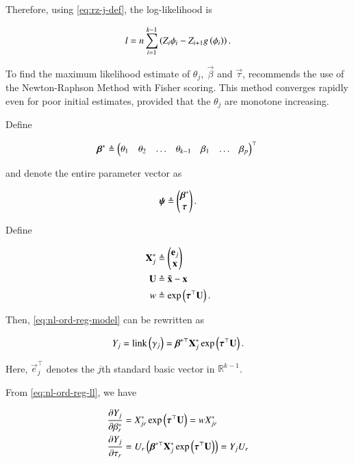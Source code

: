 \documentclass[journal,12pt,twocolumn]{IEEEtran}
\begin{document}
Therefore, using \eqref{eq:rz-j-def}, the log-likelihood is

\begin{equation}
     l = n\sum_{i=1}^{k-1}\brak{Z_i\phi_i - Z_{i+1}g\brak{\phi_i}}.
     \label{eq:ord-reg-l}
\end{equation}

To find the maximum likelihood estimate of \(\theta_j,\ \vec{\beta}\) and
\(\vec{\tau}\), \cite{PMC80} recommends the use of the Newton-Raphson Method
with Fisher scoring. This method converges rapidly even for poor initial
estimates, provided that the \(\theta_j\) are monotone increasing.

Define

\begin{equation}
     \vec{\beta}^* \triangleq \myvec{\theta_1 & \theta_2 & \ldots & \theta_{k-1} & \beta_1 & \ldots & \beta_p}^\top \\
     \label{eq:beta-star-def}
\end{equation}

and denote the entire parameter vector as

\begin{equation}
     \vec{\psi} \triangleq \myvec{\vec{\beta}^* \\ \vec{\tau}}.
     \label{eq:psi-def}
\end{equation}

Define

\begin{align}
     \vec{X}^*_j &\triangleq \myvec{\vec{e}_j \\ \vec{x}} \\
     \vec{U} &\triangleq \vec{\bar{x}} - \vec{x} \\
     w &\triangleq \exp\brak{\vec{\tau}^\top\vec{U}}.
\end{align}

Then, \eqref{eq:nl-ord-reg-model} can be rewritten as

\begin{equation}
     Y_j = \mathrm{link}\brak{\gamma_j} = \vec{\beta}^{*\top}\vec{X}^*_j\exp\brak{\vec{\tau}^\top\vec{U}}.
     \label{eq:nl-ord-reg-ll}
\end{equation}

Here, \(\vec{e}_j^\top\) denotes the \(j\)th standard basic vector in
\(\mathbb{R}^{k-1}\). 

From \eqref{eq:nl-ord-reg-ll}, we have

\begin{align}
     \pdiff{\beta^*_r}{Y_j} &= X^*_{jr}\exp\brak{\vec{\tau}^\top\vec{U}} = wX^*_{jr} \label{eq:pdiff-beta-Y} \\
     \pdiff{\tau_r}{Y_j} &= U_r\brak{\vec{\beta}^{*\top}\vec{X}^*_j\exp\brak{\vec{\tau}^\top\vec{U}}} = Y_jU_r \label{eq:pdiff-tau-Y}
\end{align}
\end{document}
